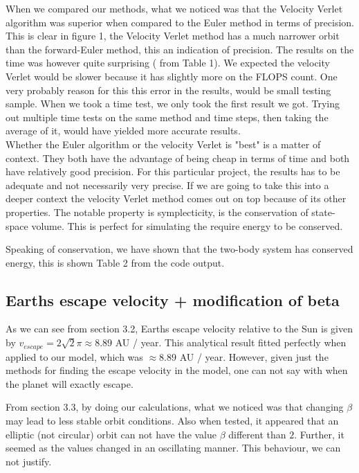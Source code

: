 \documentclass{article}
\begin{document}
When we compared our methods, what we noticed was that the Velocity Verlet algorithm was superior when compared to the Euler method in terms of precision. This is clear in figure 1, the Velocity Verlet method has a much narrower orbit than the forward-Euler method, this an indication of precision. The results on the time was however quite surprising ( from Table 1). We expected the velocity Verlet would be slower because it has slightly more on the FLOPS count. One very probably reason for this this error in the results, would be small testing sample. When we took a time test, we only took the first result we got. Trying out multiple time tests on the same method and time steps, then taking the average of it, would have yielded more accurate results. \\

Whether the Euler algorithm or the velocity Verlet is "best" is a matter of context. They both have the advantage of being cheap in terms of time and both have relatively good precision. For this particular project, the results has to be adequate and not necessarily very precise. If we are going to take this into a deeper context the velocity Verlet method comes out on top because of its other properties. The notable property is symplecticity,  is the conservation of state-space volume. This is perfect for simulating the require energy to be conserved.

Speaking of conservation, we have shown that the two-body system has conserved energy, this is shown Table 2 from the code output.

\subsection{Earths escape velocity + modification of beta}

As we can see from section 3.2, Earths escape velocity relative to the Sun is given by $v_{escape} = 2\sqrt{2}\pi \approx 8.89$ AU / year. This analytical result fitted perfectly when applied to our model, which was $\approx 8.89$ AU / year. However, given just the methods for finding the escape velocity in the model, one can not say with when the planet will exactly escape. 

From section 3.3, by doing our calculations, what we noticed was that changing $\beta$ may lead to less stable orbit conditions. Also when tested, it appeared that an elliptic (not circular) orbit can not have the value $\beta$ different than $2$. Further, it seemed as the values changed in an oscillating manner. This behaviour, we can not justify.
\end{document}
